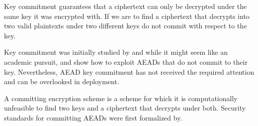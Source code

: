 Key commitment guarantees that a ciphertext can only be
decrypted under the same key it was encrypted with.
If we are to find a ciphertext that decrypts into two valid plaintexts under two different keys do not commit with respect to the key.

Key commitment was initially studied by\cite{for17} and while it might seem like an academic pursuit, \cite{dgrw18} and \cite{glr17} show how to exploit AEADs that do not commit to their key.
Nevertheless, AEAD key commitment has not received the required attention and can be overlooked in deployment.

A committing encryption scheme is a scheme for which it is computationally unfeasible to find two keys and a ciphertext that decrypts under both.
Security standards for committing AEADs were first formalized by\cite{for17}.